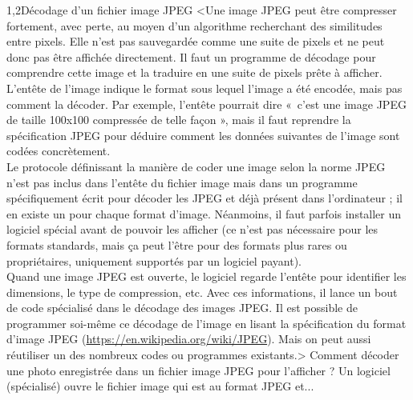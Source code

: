 \begin{quiz}[title={Organisation des données}]
\begin{quizquestion*}[t]{3}{1,2}{Décodage d'un fichier image JPEG}
<Une image JPEG peut être compresser fortement, avec perte, au moyen d'un algorithme recherchant des similitudes entre pixels. Elle n'est pas sauvegardée comme une suite de pixels et ne peut donc pas être affichée directement. Il faut un programme de décodage pour comprendre cette image et la traduire en une suite de pixels prête à afficher.\\
L'entête de l'image indique le format sous lequel l'image a été encodée, mais pas comment la décoder. Par exemple, l'entête pourrait dire «~c'est une image JPEG de taille 100x100 compressée de telle façon », mais il faut reprendre \nolinebreak la spécification JPEG pour déduire com\-ment les données suivantes de l'image sont codées concrètement.\\
Le protocole définissant la manière \nolinebreak de coder une image selon la norme JPEG n’est pas inclus dans l’entête du fichier image mais dans un programme spécifiquement écrit pour décoder les JPEG et déjà présent dans l’ordinateur ; il en existe un pour chaque format d’image. Néanmoins, il faut parfois installer un logiciel spécial avant de pouvoir les afficher (ce n’est pas nécessaire pour les formats standards, mais ça peut l’être pour des formats plus rares ou propriétaires, uniquement supportés par un logiciel payant).\\
Quand une image JPEG est ouverte, le logiciel regarde l'entête pour identifier les dimensions, le type de compression, etc. Avec ces informations, il lance un bout de code spécialisé dans le décodage des images JPEG. Il est possible de programmer soi-même ce décodage de l'image en lisant la spécification du format d'image JPEG (\url{https://en.wikipedia.org/wiki/JPEG}). Mais on peut aussi réutiliser un des nombreux codes ou programmes existants.>
Comment décoder une photo enregistrée dans un fichier image JPEG pour l'afficher ?
Un logiciel (spécialisé) ouvre le fichier image qui est au format JPEG et...
\end{quizquestion*}
\end{quiz}


